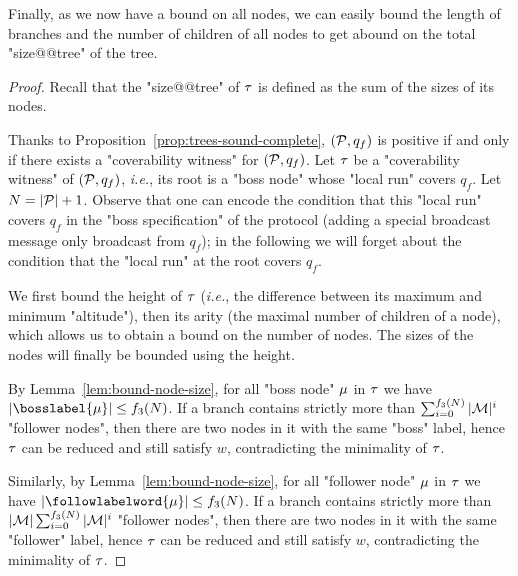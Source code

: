Finally, as we now have a bound on all nodes, we can easily bound the length of branches and the number of children of all nodes to get abound on the total "size@@tree" of the tree.

\PropBoundTreeSize*


\begin{proof}
	Recall that the "size@@tree" of $\tau$ is defined as the sum of the sizes of its nodes. 

	Thanks to Proposition~\ref{prop:trees-sound-complete}, $(\mathcal{P},q_f)$ is positive if and only if there exists a "coverability witness" for $(\mathcal{P},q_f)$.
	Let $\tau$ be a "coverability witness" of $(\mathcal{P},q_f)$, \emph{i.e.}, its root is a "boss node" whose "local run" covers $q_f$. Let $N = |\mathcal{P}|+1$. Observe that one can encode the condition that this "local run" covers $q_f$ in the "boss specification" of the protocol (adding a special broadcast message only broadcast from $q_f$); in the following we will forget about the condition that the "local run" at the root covers $q_f$.
	
	We first bound the height of $\tau$ (\emph{i.e.}, the difference between its maximum and minimum "altitude"), then its arity (the maximal number of children of a node), which allows us to obtain a bound on the number of nodes. The sizes of the nodes will finally be bounded using the height. 
	
	By Lemma~\ref{lem:bound-node-size}, for all "boss node" $\mu$ in $\tau$ we have $\size{\bosslabel{\node}} \leq f_3(N)$.
	If a branch contains strictly more than $\sum_{i=0}^{f_3(N)}|\mathcal{M}|^{i}$ "follower nodes", then there are two nodes in it with the same "boss" label, hence $\tau$ can be reduced and still satisfy $w$, contradicting the minimality of $\tau$.

	Similarly, by Lemma~\ref{lem:bound-node-size}, for all "follower node" $\mu$ in $\tau$ we have $\size{\followlabelword{\node}} \leq f_3(N)$.
	If a branch contains strictly more than $|\mathcal{M}| \sum_{i=0}^{f_3(N)}|\mathcal{M}|^{i}$ "follower nodes", then there are two nodes in it with the same "follower" label, hence $\tau$ can be reduced and still satisfy $w$, contradicting the minimality of $\tau$.
	

\end{proof}
